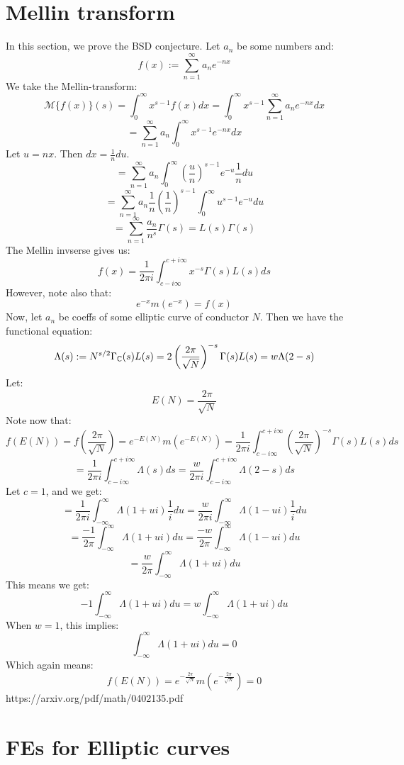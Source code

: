 \documentclass[a4paper]{amsart}
\begin{document}
\section{Mellin transform}
In this section, we prove the BSD conjecture. Let $a_n$ be some numbers and:
$$f(x) := \sum_{n = 1}^\infty a_n e^{-nx}$$
We take the Mellin-transform: 
$$\mathcal{M}\{f(x)\}(s) = \int_0^\infty x^{s - 1} f(x) dx = \int_0^\infty x^{s - 1} \sum_{n = 1}^\infty a_n e^{-nx} dx$$
$$ = \sum_{n = 1}^\infty a_n \int_0^\infty x^{s - 1} e^{-nx} dx$$
Let $u = nx$. Then $dx = \frac{1}{n} du$.
$$ = \sum_{n = 1}^\infty a_n \int_0^\infty \left(\frac{u}{n}\right)^{s - 1} e^{-u} \frac{1}{n} du$$
$$ = \sum_{n = 1}^\infty a_n \frac{1}{n} \left(\frac{1}{n}\right)^{s - 1} \int_0^\infty u^{s - 1} e^{-u} du$$
$$ = \sum_{n = 1}^\infty \frac{a_n}{n^s} \Gamma(s) = L(s) \Gamma(s)$$
The Mellin invserse gives us: 
$$f(x) = \frac{1}{2\pi i}\int_{c - i \infty}^{c + i \infty} x^{-s} \Gamma(s) L(s)ds$$
However, note also that:
$$e^{-x}m(e^{-x}) = f(x)$$
Now, let $a_n$ be coeffs of some elliptic curve of conductor $N$. Then we have the functional equation:
$$\Lambda(s) := N^{s/2} \Gamma_{\mathbb{C}}(s) L(s) = 2 \left(\frac{2\pi}{\sqrt{N}}\right)^{-s} \Gamma(s) L(s) = w\Lambda(2 - s)$$
Let:
$$E(N) = \frac{2\pi}{\sqrt{N}}$$
Note now that:
$$ f(E(N)) = f\left(\frac{2\pi}{\sqrt{N}}\right) = e^{-E(N)} m\left(e^{-E(N)}\right) = \frac{1}{2\pi i} \int_{c - i \infty}^{c + i \infty} \left(\frac{2\pi}{\sqrt{N}}\right)^{-s} \Gamma(s) L(s)ds$$
$$ = \frac{1}{2\pi i} \int_{c - i \infty}^{c + i \infty} \Lambda(s) ds = \frac{w}{2\pi i}\int_{c - i \infty}^{c + i \infty} \Lambda(2 - s) ds$$
Let $c = 1$,  and we get:
$$ = \frac{1}{2\pi i} \int_{-\infty}^{\infty} \Lambda(1 + ui) \frac{1}{i}du = \frac{w}{2\pi i}\int_{-\infty}^{\infty} \Lambda(1 - ui) \frac{1}{i}du$$
$$ = \frac{-1}{2\pi} \int_{-\infty}^{\infty} \Lambda(1 + ui) du = \frac{-w}{2\pi}\int_{-\infty}^{\infty} \Lambda(1 - ui) du$$
$$ = \frac{w}{2\pi}\int_{-\infty}^{\infty} \Lambda(1 + ui) du$$
This means we get:
$$-1 \int_{-\infty}^{\infty} \Lambda(1 + ui) du = w\int_{-\infty}^{\infty} \Lambda(1 + ui) du$$
When $w = 1$, this implies:
$$\int_{-\infty}^{\infty} \Lambda(1 + ui) du = 0$$
Which again means: 
$$f(E(N)) = e^{-\frac{2\pi}{\sqrt{N}}} m\left(e^{-\frac{2\pi}{\sqrt{N}}}\right) = 0$$
https://arxiv.org/pdf/math/0402135.pdf
\section{FEs for Elliptic curves}
\end{document}
